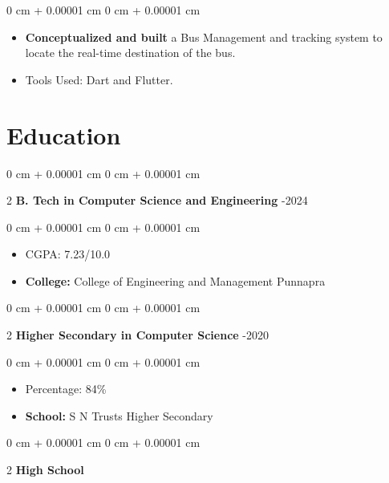 \documentclass[10pt, letterpaper]{article}
\newenvironment{highlights}{ \begin{itemize}[ topsep=0.10 cm, parsep=0.10 cm, partopsep=0pt,
itemsep=0pt, leftmargin=0 cm + 10pt ] }{ \end{itemize} } %
\newenvironment{onecolentry}{ \begin{adjustwidth}{ 0 cm + 0.00001 cm }{ 0 cm + 0.00001 cm }
}{ \end{adjustwidth} } %
\newenvironment{twocolentry}[2][]{ \onecolentry \def\secondColumn{#2} \setcolumnwidth{\fill, 4.5 cm}
\begin{paracol}{2} }{ \switchcolumn \raggedleft \secondColumn \end{paracol}
\endonecolentry } %
\begin{document}
	\vspace{0.10 cm}
	\begin{onecolentry}
		\begin{highlights}
			\item \textbf{Conceptualized and built} a Bus Management and tracking
			system to locate the real-time destination of the bus.
			\item Tools Used: Dart and Flutter.
		\end{highlights}
	\end{onecolentry}
	\vspace{0.2 cm}

	\section{Education}

	\begin{twocolentry}
		{ 2020-2024 } \textbf{B. Tech in Computer Science and Engineering}
	\end{twocolentry}

	\vspace{0.10 cm}
	\begin{onecolentry}
		\begin{highlights}
			\item CGPA: 7.23/10.0 \item \textbf{College:} College of Engineering and Management
			Punnapra
		\end{highlights}
	\end{onecolentry}
	\vspace{0.3 cm}

	\begin{twocolentry}
		{ 2018-2020 } \textbf{Higher Secondary in Computer Science}
	\end{twocolentry}

	\vspace{0.10 cm}
	\begin{onecolentry}
		\begin{highlights}
			\item Percentage: 84\% \item \textbf{School:} S N Trusts Higher Secondary
		\end{highlights}
	\end{onecolentry}
	\vspace{0.3 cm}

	\begin{twocolentry}
		{ 2018 } \textbf{High School}
	\end{twocolentry}
\end{document}

